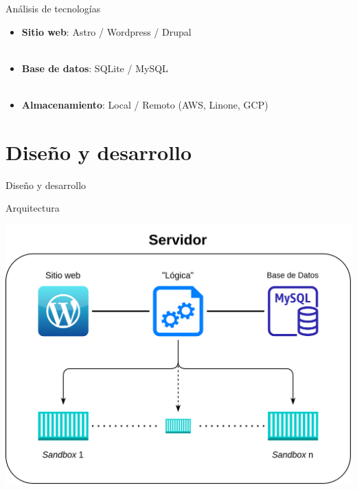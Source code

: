     \begin{frame}{Análisis de tecnologías}


        \begin{itemize}
            \item \textbf{Sitio web}: Astro / Wordpress / Drupal
            \\~\\
            \item \textbf{Base de datos}: SQLite / MySQL
            \\~\\
            \item \textbf{Almacenamiento}: Local / Remoto (AWS, Linone, GCP) 
        \end{itemize}
    \end{frame}


\section{Diseño y desarrollo}

    \begin{frame}
        \Huge{\centerline{Diseño y desarrollo}}
    \end{frame}

    \begin{frame}{Arquitectura}
        \centering

        \includegraphics[scale=0.15]{images/diagramas/arquitectura.png}
    \end{frame}

